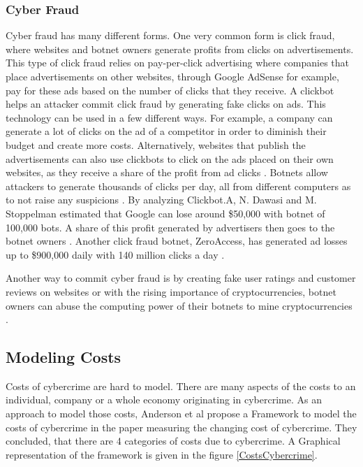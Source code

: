 		\subsubsection{Cyber Fraud}
		Cyber fraud has many different forms. One very common form is click fraud, where websites and botnet owners generate profits from clicks on advertisements. This type of click fraud relies on pay-per-click advertising where companies that place advertisements on other websites, through Google AdSense for example, pay for these ads based on the number of clicks that they receive. A clickbot helps an attacker commit click fraud by generating fake clicks on ads. This technology can be used in a few different ways. For example, a company can generate a lot of clicks on the ad of a competitor in order to diminish their budget and create more costs. Alternatively, websites that publish the advertisements can also use clickbots to click on the ads placed on their own websites, as they receive a share of the profit from ad clicks \cite{Daswani07}. Botnets allow attackers to generate thousands of clicks per day, all from different computers as to not raise any suspicions \cite{Namestnikov09}. By analyzing Clickbot.A, N. Dawasi and M. Stoppelman estimated that Google can lose around \$50,000 with botnet of 100,000 bots. A share of this profit generated by advertisers then goes to the botnet owners \cite{Daswani07}. Another click fraud botnet, ZeroAccess, has generated ad losses up to \$900,000 daily with 140 million clicks a day \cite{Bottazzi14}.

Another way to commit cyber fraud is by creating fake user ratings and customer reviews on websites or with the rising importance of cryptocurrencies, botnet owners can abuse the computing power of their botnets to mine cryptocurrencies \cite{Putman}.

\subsection{Modeling Costs}
Costs of cybercrime are hard to model. There are many aspects of the costs to an individual, company or a whole economy originating in cybercrime. As an approach to model those costs, Anderson et al propose a Framework to model the costs of cybercrime in the paper measuring the changing cost of cybercrime. They concluded, that there are 4 categories of costs due to cybercrime. A Graphical representation of the framework is given in the figure \ref{CostsCybercrime}. \cite{Anderson19}

